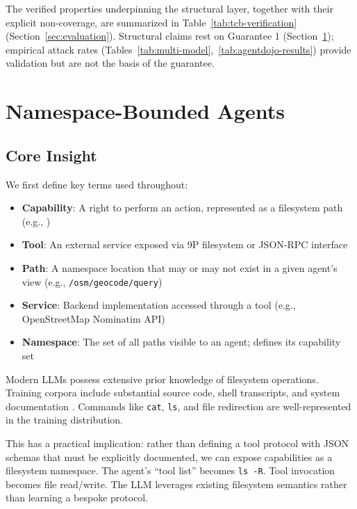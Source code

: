 \documentclass{article}
\begin{document}
The verified properties underpinning the structural layer, together with their explicit non-coverage, are summarized in Table~\ref{tab:tcb-verification} (Section~\ref{sec:evaluation}). Structural claims rest on Guarantee 1 (Section~\ref{sec:design}); empirical attack rates (Tables~\ref{tab:multi-model},~\ref{tab:agentdojo-results}) provide validation but are not the basis of the guarantee.

\section{Namespace-Bounded Agents}
\label{sec:design}

\subsection{Core Insight}

We first define key terms used throughout:

\begin{itemize}
    \item \textbf{Capability}: A right to perform an action, represented as a filesystem path (e.g., )
    \item \textbf{Tool}: An external service exposed via 9P filesystem or JSON-RPC interface
    \item \textbf{Path}: A namespace location that may or may not exist in a given agent's view (e.g., \texttt{/osm/geocode/query})
    \item \textbf{Service}: Backend implementation accessed through a tool (e.g., OpenStreetMap Nominatim API)
    \item \textbf{Namespace}: The set of all paths visible to an agent; defines its capability set
\end{itemize}

Modern LLMs possess extensive prior knowledge of filesystem operations. Training corpora include substantial source code, shell transcripts, and system documentation \cite{chen2021codex,roziere2023codellama,kocetkov2022stack}. Commands like \texttt{cat}, \texttt{ls}, and file redirection are well-represented in the training distribution.

This has a practical implication: rather than defining a tool protocol with JSON schemas that must be explicitly documented, we can expose capabilities as a filesystem namespace. The agent's ``tool list'' becomes \texttt{ls -R}. Tool invocation becomes file read/write. The LLM leverages existing filesystem semantics rather than learning a bespoke protocol.
\end{document}
